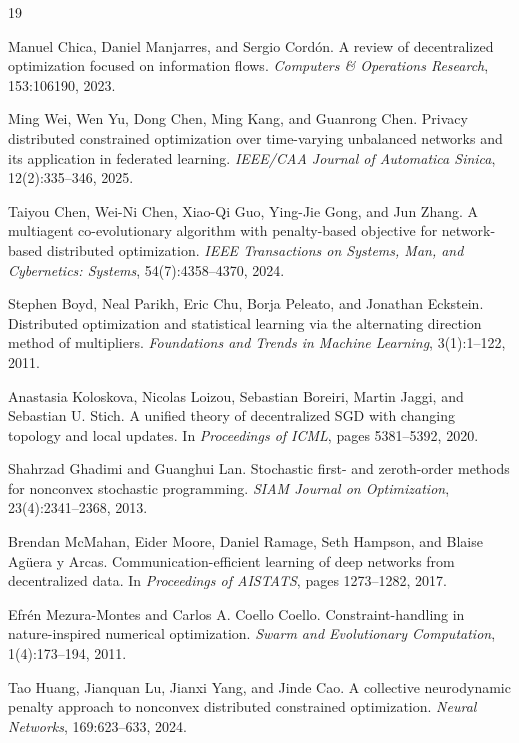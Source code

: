 \begin{thebibliography}{19}

Manuel Chica, Daniel Manjarres, and Sergio Cord\'on.
A review of decentralized optimization focused on information flows.
\emph{Computers \& Operations Research}, 153:106190, 2023.

Ming Wei, Wen Yu, Dong Chen, Ming Kang, and Guanrong Chen.
Privacy distributed constrained optimization over time-varying unbalanced networks and its application in federated learning.
\emph{IEEE/CAA Journal of Automatica Sinica}, 12(2):335--346, 2025.

Taiyou Chen, Wei-Ni Chen, Xiao-Qi Guo, Ying-Jie Gong, and Jun Zhang.
A multiagent co-evolutionary algorithm with penalty-based objective
for network-based distributed optimization.
\emph{IEEE Transactions on Systems, Man, and Cybernetics: Systems},
54(7):4358--4370, 2024.

Stephen Boyd, Neal Parikh, Eric Chu, Borja Peleato, and Jonathan Eckstein.
Distributed optimization and statistical learning via the alternating direction method of multipliers.
\emph{Foundations and Trends in Machine Learning}, 3(1):1--122, 2011.

Anastasia Koloskova, Nicolas Loizou, Sebastian Boreiri, Martin Jaggi, and Sebastian U. Stich.
A unified theory of decentralized SGD with changing topology and local updates.
In \emph{Proceedings of ICML}, pages 5381--5392, 2020.

Shahrzad Ghadimi and Guanghui Lan.
Stochastic first- and zeroth-order methods for nonconvex stochastic programming.
\emph{SIAM Journal on Optimization}, 23(4):2341--2368, 2013.

Brendan McMahan, Eider Moore, Daniel Ramage, Seth Hampson, and Blaise Ag\"uera y Arcas.
Communication-efficient learning of deep networks from decentralized data.
In \emph{Proceedings of AISTATS}, pages 1273--1282, 2017.

Efr\'en Mezura-Montes and Carlos A. Coello Coello.
Constraint-handling in nature-inspired numerical optimization.
\emph{Swarm and Evolutionary Computation}, 1(4):173--194, 2011.

Tao Huang, Jianquan Lu, Jianxi Yang, and Jinde Cao.
A collective neurodynamic penalty approach to nonconvex distributed constrained optimization.
\emph{Neural Networks}, 169:623--633, 2024.


\end{thebibliography}
